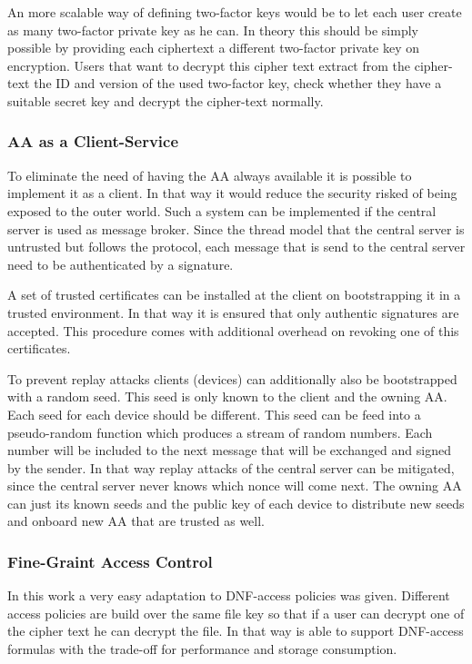 An more scalable way of defining two-factor keys would be to let each user create as many two-factor private key as he can. In theory this should be simply possible by providing each ciphertext a different two-factor private key on encryption. Users that want to decrypt this cipher text extract from the cipher-text the ID and version of the used two-factor key, check whether they have a suitable secret key and decrypt the cipher-text normally. 

\subsubsection{AA as a Client-Service}
To eliminate the need of having the AA always available it is possible to implement it as a client. In that way it would reduce the security risked of being exposed to the outer world. Such a system can be implemented if the central server is used as message broker. Since the thread model that the central server is untrusted but follows the protocol, each message that is send to the central server need to be authenticated by a signature. 

A set of trusted certificates can be installed at the client on bootstrapping it in a trusted environment. In that way it is ensured that only authentic signatures are accepted. This procedure comes with additional overhead on revoking one of this certificates. 

To prevent replay attacks clients (devices) can additionally also be bootstrapped with a random seed. This seed is only known to the client and the owning AA. Each seed for each device should be different. This seed can be feed into a pseudo-random function which produces a stream of random numbers. Each number will be included to the next message that will be exchanged and signed by the sender. In that way replay attacks of the central server can be mitigated, since the central server never knows which nonce will come next. The owning AA can just its known seeds and the public key of each device to distribute new seeds and onboard new AA that are trusted as well. 

\subsubsection{Fine-Graint Access Control}
In this work a very easy adaptation to DNF-access policies was given. Different access policies are build over the same file key so that if a user can decrypt one of the cipher text he can decrypt the file. In that way \name is able to support DNF-access formulas with the trade-off for performance and storage consumption.  

